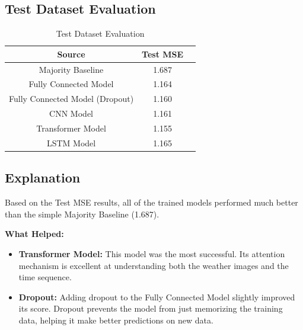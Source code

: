 \documentclass[12pt, a4paper]{article}
\begin{document}
            \subsection{Test Dataset Evaluation}
                \begin{table}[h]
                    \centering
                    \begin{tabular}{|c|c|c|}
                        \hline
                        \textbf{Source} & \textbf{Test MSE} \\
                        \hline \hline
                        Majority Baseline & 1.687 \\
                        Fully Connected Model & 1.164 \\
                        Fully Connected Model (Dropout) & 1.160 \\
                        CNN Model & 1.161 \\
                        Transformer Model & 1.155 \\
                        LSTM Model & 1.165 \\
                        \hline
                    \end{tabular}
                    \caption{Test Dataset Evaluation}
                \end{table}

            \subsection{Explanation}

                Based on the Test MSE results, all of the trained models performed much better than the simple Majority Baseline (1.687).

                \vspace{1em}

                \noindent \textbf{What Helped:}
                \begin{itemize}
                    \item \textbf{Transformer Model:} This model was the most successful.
                    Its attention mechanism is excellent at understanding both the weather images and the time sequence.
                    \item \textbf{Dropout:} Adding dropout to the Fully Connected Model slightly improved its score.
                    Dropout prevents the model from just memorizing the training data, helping it make better predictions on new data.
                \end{itemize}
\end{document}
